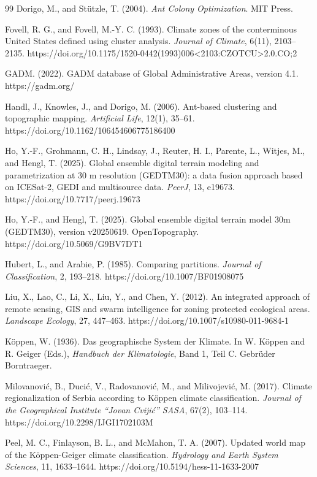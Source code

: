 \documentclass[11pt]{article}
\begin{document}
\begin{thebibliography}{99}
Dorigo, M., and Stützle, T. (2004).
\textit{Ant Colony Optimization}.
MIT Press.

Fovell, R. G., and Fovell, M.-Y. C. (1993).
Climate zones of the conterminous United States defined using cluster analysis.
\textit{Journal of Climate}, 6(11), 2103--2135.
https://doi.org/10.1175/1520-0442(1993)006<2103:CZOTCU>2.0.CO;2

GADM. (2022).
GADM database of Global Administrative Areas, version 4.1.
https://gadm.org/

Handl, J., Knowles, J., and Dorigo, M. (2006).
Ant-based clustering and topographic mapping.
\textit{Artificial Life}, 12(1), 35--61.
https://doi.org/10.1162/106454606775186400

Ho, Y.-F., Grohmann, C. H., Lindsay, J., Reuter, H. I., Parente, L., Witjes, M., and Hengl, T. (2025).
Global ensemble digital terrain modeling and parametrization at 30 m resolution (GEDTM30): a data fusion approach based on ICESat-2, GEDI and multisource data.
\textit{PeerJ}, 13, e19673.
https://doi.org/10.7717/peerj.19673

Ho, Y.-F., and Hengl, T. (2025).
Global ensemble digital terrain model 30m (GEDTM30), version v20250619.
OpenTopography.
https://doi.org/10.5069/G9BV7DT1

Hubert, L., and Arabie, P. (1985).
Comparing partitions.
\textit{Journal of Classification}, 2, 193--218.
https://doi.org/10.1007/BF01908075

Liu, X., Lao, C., Li, X., Liu, Y., and Chen, Y. (2012).
An integrated approach of remote sensing, GIS and swarm intelligence for zoning protected ecological areas.
\textit{Landscape Ecology}, 27, 447--463.
https://doi.org/10.1007/s10980-011-9684-1

Köppen, W. (1936).
Das geographische System der Klimate.
In W. Köppen and R. Geiger (Eds.), \textit{Handbuch der Klimatologie}, Band 1, Teil C.
Gebrüder Borntraeger.

Milovanović, B., Ducić, V., Radovanović, M., and Milivojević, M. (2017).
Climate regionalization of Serbia according to Köppen climate classification.
\textit{Journal of the Geographical Institute ``Jovan Cvijić'' SASA}, 67(2), 103--114.
https://doi.org/10.2298/IJGI1702103M

Peel, M. C., Finlayson, B. L., and McMahon, T. A. (2007).
Updated world map of the Köppen-Geiger climate classification.
\textit{Hydrology and Earth System Sciences}, 11, 1633--1644.
https://doi.org/10.5194/hess-11-1633-2007


\end{thebibliography}
\end{document}
